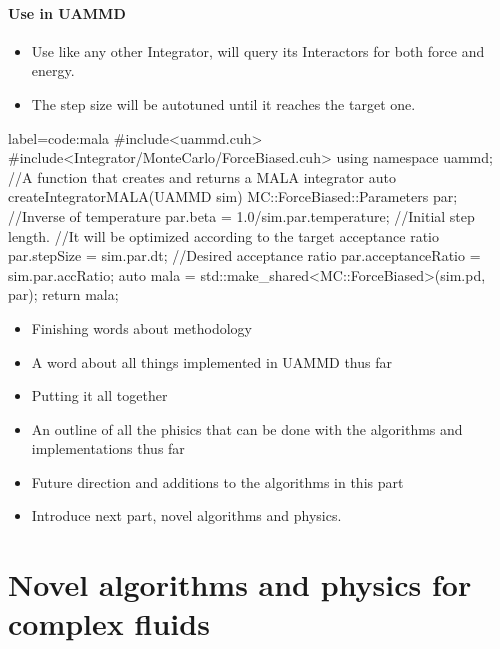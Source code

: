 \documentclass[ twoside,openright,titlepage,numbers=noenddot,%
headinclude,footinclude,cleardoublepage=empty,abstract=on,
BCOR=5mm,paper=a4,fontsize=11pt, dvipsnames
]{scrreprt}
\begin{document}
\subsection*{Use in UAMMD}

\begin{itemize}
\item Use like any other Integrator, will query its Interactors for both force and energy.
\item The step size will be autotuned until it reaches the target one.
\end{itemize}
\begin{code2}{label=code:mala}
#include<uammd.cuh>
#include<Integrator/MonteCarlo/ForceBiased.cuh>
using namespace uammd;
//A function that creates and returns a MALA integrator
auto createIntegratorMALA(UAMMD sim){   
  MC::ForceBiased::Parameters par;
  //Inverse of temperature
  par.beta = 1.0/sim.par.temperature;	
  //Initial step length.
  //It will be optimized according to the target acceptance ratio
  par.stepSize = sim.par.dt;
  //Desired acceptance ratio 
  par.acceptanceRatio = sim.par.accRatio;
  auto mala = std::make_shared<MC::ForceBiased>(sim.pd, par);
  return mala;
}
\end{code2}



\begin{itemize}
\item Finishing words about methodology
\item A word about all things implemented in UAMMD thus far
\item Putting it all together
\item An outline of all the phisics that can be done with the algorithms and implementations thus far
\item Future direction and additions to the algorithms in this part
\item Introduce next part, novel algorithms and physics.

\end{itemize}
\cleardoublepage
\part{Novel algorithms and physics for complex fluids}\label{pt:algo}
\end{document}
